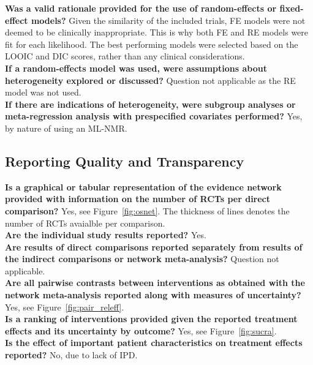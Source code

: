 \textbf{Was a valid rationale provided for the use of random-effects
or fixed-effect models?} Given the similarity of the included trials, FE models were not deemed to be clinically inappropriate. This is why both FE and RE models were fit for each likelihood. The best performing models were selected based on the LOOIC and DIC scores, rather than any clinical considerations. \\

\textbf{If a random-effects model was used, were assumptions
about heterogeneity explored or discussed?} Question not applicable as the RE model was not used.\\

\textbf{If there are indications of heterogeneity, were subgroup
analyses or meta-regression analysis with prespecified
covariates performed?} Yes, by nature of using an ML-NMR.\\

\subsection{Reporting Quality and Transparency}

\textbf{Is a graphical or tabular representation of the evidence
network provided with information on the number of RCTs per
direct comparison?} Yes, see Figure~\ref{fig:osnet}. The thickness of lines denotes the number of RCTs avaialble per comparison. \\

\textbf{Are the individual study results reported?} Yes.\\

\textbf{Are results of direct comparisons reported separately from
results of the indirect comparisons or network meta-analysis?} Question not applicable.\\

\textbf{Are all pairwise contrasts between interventions as obtained
with the network meta-analysis reported along with measures
of uncertainty?} Yes, see Figure~\ref{fig:pair_releff}.\\

\textbf{Is a ranking of interventions provided given the reported
treatment effects and its uncertainty by outcome?} Yes, see Figure~\ref{fig:sucra}. \\

\textbf{Is the effect of important patient characteristics on treatment
effects reported?} No, due to lack of IPD. \\

